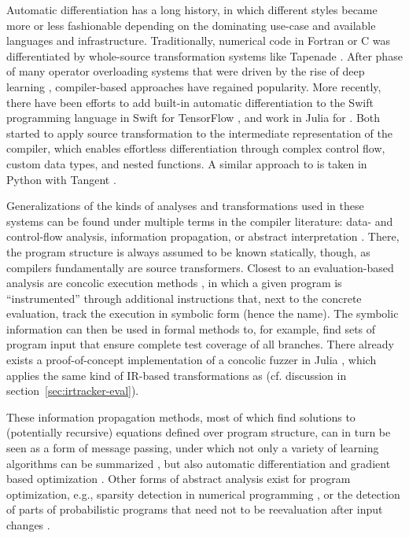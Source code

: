 Automatic differentiation has a long history, in which different styles became more or less
fashionable depending on the dominating use-case and available languages and infrastructure.
Traditionally, numerical code in Fortran or C was differentiated by whole-source transformation
systems like Tapenade \parencite{tapenadedevelopers2019tapenade}.  After phase of many operator
overloading systems that were driven by the rise of deep learning
\parencite{abadi2015tensorflow,paszke2017automatic,neubig2017dynet,tokui2015chainer}, compiler-based
approaches have regained popularity.  More recently, there have been efforts to add built-in
automatic differentiation to the Swift programming language in Swift for TensorFlow
\parencite{tensorflowdevelopers2018swift}, and work in Julia for 
\parencite{innes2018don}.  Both started to apply source transformation to the intermediate
representation of the compiler, which enables effortless differentiation through complex control
flow, custom data types, and nested functions.  A similar approach to  is
taken in Python with Tangent \parencite{vanmerrienboer2018tangent}.

Generalizations of the kinds of analyses and transformations used in these systems can be found
under multiple terms in the compiler literature: data- and control-flow analysis, information
propagation, or abstract interpretation \parencite{muchnick1997advanced,singer2018static}.  There,
the program structure is always assumed to be known statically, though, as compilers fundamentally
are source transformers.  Closest to an evaluation-based analysis are concolic execution methods
\parencite{sen2005cute,zeller2019concolic}, in which a given program is \enquote{instrumented}
through additional instructions that, next to the concrete evaluation, track the execution in
symbolic form (hence the name).  The symbolic information can then be used in formal methods to, for
example, find sets of program input that ensure complete test coverage of all branches.  There
already exists a proof-of-concept implementation of a concolic fuzzer in Julia
\parencite{churavy2019vchuravy}, which applies the same kind of IR-based transformations as
 (cf. discussion in section~\ref{sec:irtracker-eval}).

These information propagation methods, most of which find solutions to (potentially recursive)
equations defined over program structure, can in turn be seen as a form of message passing, under
which not only a variety of learning algorithms can be summarized \parencite{minka2005divergence},
but also automatic differentiation \parencite{minka2019automatic} and gradient based optimization
\parencite{dauwels2005steepest}.  Other forms of abstract analysis exist for program optimization,
e.g., sparsity detection in numerical programming \parencite{gowda2019sparsity}, or the detection of
parts of probabilistic programs that need not to be reevaluation after input changes
\parencite{becker2020dynamic}.

